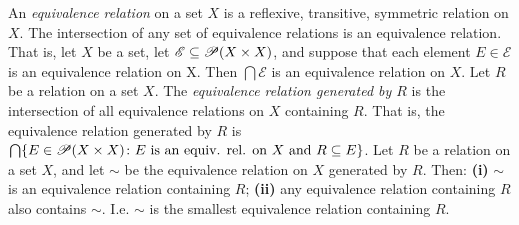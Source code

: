  An \textit{equivalence relation} on a set $X$ is a reflexive, transitive, symmetric relation on $X$.
 The intersection of any set of equivalence relations is an equivalence relation. That is, let $X$ be a set, let $\mathscr{E} \subseteq \operatorname{\mathscr{P}}(X \times X)$, and suppose that each element $E \in \mathscr{E}$ is an equivalence relation on X. Then $\bigcap\mathscr{E}$ is an equivalence relation on $X$.
 Let $R$ be a relation on a set $X$. The \textit{equivalence relation generated by $R$} is the intersection of all equivalence relations on $X$ containing $R$. That is, the equivalence relation generated by $R$ is $\bigcap\{ E \in \operatorname{\mathscr{P}}(X \times X) \colon E \text{ is an equiv. rel. on } X \text{ and } R \subseteq E \}$.
 Let $R$ be a relation on a set $X$, and let $\sim$ be the equivalence relation on $X$ generated by $R$. Then: \textbf{(i)} $\sim$ is an equivalence relation containing $R$; \textbf{(ii)} any equivalence relation containing $R$ also contains $\sim$. I.e. $\sim$ is the smallest equivalence relation containing $R$.
